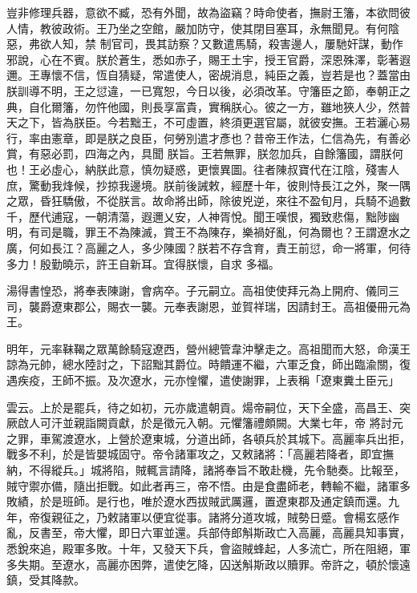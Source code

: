 \begin{pinyinscope}
 豈非修理兵器，意欲不臧，恐有外聞，故為盜竊？時命使者，撫尉王籓，本欲問彼人情，教彼政術。王乃坐之空館，嚴加防守，使其閉目塞耳，永無聞見。有何陰惡，弗欲人知，禁
 制官司，畏其訪察？又數遣馬騎，殺害邊人，屢馳奸謀，動作邪說，心在不賓。朕於蒼生，悉如赤子，賜王土宇，授王官爵，深恩殊澤，彰著遐邇。王專懷不信，恆自猜疑，常遣使人，密覘消息，純臣之義，豈若是也？蓋當由朕訓導不明，王之愆違，一已寬恕，今日以後，必須改革。守籓臣之節，奉朝正之典，自化爾籓，勿忤他國，則長享富貴，實稱朕心。彼之一方，雖地狹人少，然普天之下，皆為朕臣。今若黜王，不可虛置，終須更選官屬，就彼安撫。王若灑心易行，率由憲章，即是朕之良臣，何勞別遣才彥也？昔帝王作法，仁信為先，有善必賞，有惡必罰，四海之內，具聞
 朕旨。王若無罪，朕忽加兵，自餘籓國，謂朕何也！王必虛心，納朕此意，慎勿疑惑，更懷異圖。往者陳叔寶代在江陰，殘害人庶，驚動我烽候，抄掠我邊境。朕前後誡敕，經歷十年，彼則恃長江之外，聚一隅之眾，昏狂驕傲，不從朕言。故命將出師，除彼兇逆，來往不盈旬月，兵騎不過數千，歷代逋寇，一朝清蕩，遐邇乂安，人神胥悅。聞王嘆恨，獨致悲傷，黜陟幽明，有司是職，罪王不為陳滅，賞王不為陳存，樂禍好亂，何為爾也？王謂遼水之廣，何如長江？高麗之人，多少陳國？朕若不存含育，責王前愆，命一將軍，何待多力！殷勤曉示，許王自新耳。宜得朕懷，自求
 多福。



 湯得書惶恐，將奉表陳謝，會病卒。子元嗣立。高祖使使拜元為上開府、儀同三司，襲爵遼東郡公，賜衣一襲。元奉表謝恩，並賀祥瑞，因請封王。高祖優冊元為王。



 明年，元率靺鞨之眾萬餘騎寇遼西，營州總管韋沖擊走之。高祖聞而大怒，命漢王諒為元帥，總水陸討之，下詔黜其爵位。時饋運不繼，六軍乏食，師出臨渝關，復遇疾疫，王師不振。及次遼水，元亦惶懼，遣使謝罪，上表稱「遼東糞土臣元」



 雲云。上於是罷兵，待之如初，元亦歲遣朝貢。煬帝嗣位，天下全盛，高昌王、突厥啟人可汗並親詣闕貢獻，於是徵元入朝。元懼籓禮頗闕。大業七年，帝
 將討元之罪，車駕渡遼水，上營於遼東城，分道出師，各頓兵於其城下。高麗率兵出拒，戰多不利，於是皆嬰城固守。帝令諸軍攻之，又敕諸將：「高麗若降者，即宜撫納，不得縱兵。」城將陷，賊輒言請降，諸將奉旨不敢赴機，先令馳奏。比報至，賊守禦亦備，隨出拒戰。如此者再三，帝不悟。由是食盡師老，轉輸不繼，諸軍多敗績，於是班師。是行也，唯於遼水西拔賊武厲邏，置遼東郡及通定鎮而還。九年，帝復親征之，乃敕諸軍以便宜從事。諸將分道攻城，賊勢日蹙。會楊玄感作亂，反書至，帝大懼，即日六軍並還。兵部侍郎斛斯政亡入高麗，高麗具知事實，
 悉銳來追，殿軍多敗。十年，又發天下兵，會盜賊蜂起，人多流亡，所在阻絕，軍多失期。至遼水，高麗亦困弊，遣使乞降，囚送斛斯政以贖罪。帝許之，頓於懷遠鎮，受其降款。




\end{pinyinscope}
